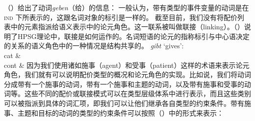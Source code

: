 （）给出了动词\emph{geben}（给）的\contv 信息：
\ea
\label{mrs-geben}
\z
一般认为，带有类型的事件变量的动词是在\textsc{ind} 下所表示的，这跟名词对象的标引是一样的。 
截至目前，我们没有将配价列表中的元素指派给语义表示中的论元角色。这一联系被叫做联接（linking）。（）说明了HPSG理论中，联接是如何运作的。名词短语的论元的指称标引与中心语决定的关系的语义角色中的一种情况是结构共享的。
\eas
\label{le-geben}
\emph{gibt} `gives':\\
\ms
{ cat &  \\
  cont &  
}
\zs
因为我们使用诸如施事（agent）和受事（patient）这样的术语来表示论元角色，我们就有可以说明配价类型的概况和论元角色的实现。比如说，我们将动词分成带有一个施事的动词，带有一个施事和主题的动词，以及带有施事和受事的动词等。这些不同的配价或联接模式可以在类型层级体系中进行表示，而且这些类别可以被指派到具体的词汇项，即我们可以让他们继承各自类型的约束条件。带有施事、主题和目标的动词的类型的约束条件可以按照（）中的形式来表示：

